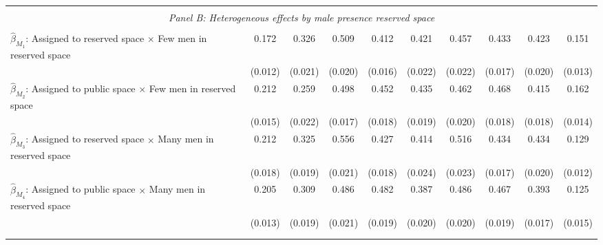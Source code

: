 \begin{tabular}{l*{9}{c}}
\hline \\[-1ex] \multicolumn{10}{c}{\textit{Panel B: Heterogeneous effects by male presence reserved space}} \\\\[-1ex]
$\hat\beta_{M_1}$: Assigned to reserved space $\times$ Few men in reserved space&       0.172\sym{***}&       0.326\sym{***}&       0.509\sym{***}&       0.412\sym{***}&       0.421\sym{***}&       0.457\sym{***}&       0.433\sym{***}&       0.423\sym{***}&       0.151\sym{***}\\
                    &     (0.012)         &     (0.021)         &     (0.020)         &     (0.016)         &     (0.022)         &     (0.022)         &     (0.017)         &     (0.020)         &     (0.013)         \\
[1em]
$\hat\beta_{M_2}$: Assigned to public space $\times$ Few men in reserved space&       0.212\sym{***}&       0.259\sym{***}&       0.498\sym{***}&       0.452\sym{***}&       0.435\sym{***}&       0.462\sym{***}&       0.468\sym{***}&       0.415\sym{***}&       0.162\sym{***}\\
                    &     (0.015)         &     (0.022)         &     (0.017)         &     (0.018)         &     (0.019)         &     (0.020)         &     (0.018)         &     (0.018)         &     (0.014)         \\
[1em]
$\hat\beta_{M_3}$: Assigned to reserved space $\times$ Many men in reserved space&       0.212\sym{***}&       0.325\sym{***}&       0.556\sym{***}&       0.427\sym{***}&       0.414\sym{***}&       0.516\sym{***}&       0.434\sym{***}&       0.434\sym{***}&       0.129\sym{***}\\
                    &     (0.018)         &     (0.019)         &     (0.021)         &     (0.018)         &     (0.024)         &     (0.023)         &     (0.017)         &     (0.020)         &     (0.012)         \\
[1em]
$\hat\beta_{M_4}$: Assigned to public space $\times$ Many men in reserved space&       0.205\sym{***}&       0.309\sym{***}&       0.486\sym{***}&       0.482\sym{***}&       0.387\sym{***}&       0.486\sym{***}&       0.467\sym{***}&       0.393\sym{***}&       0.125\sym{***}\\
                    &     (0.013)         &     (0.019)         &     (0.021)         &     (0.019)         &     (0.020)         &     (0.020)         &     (0.019)         &     (0.017)         &     (0.015)         \\
\\[-1.8ex] \hline \\[-1.8ex]  

\end{tabular}
